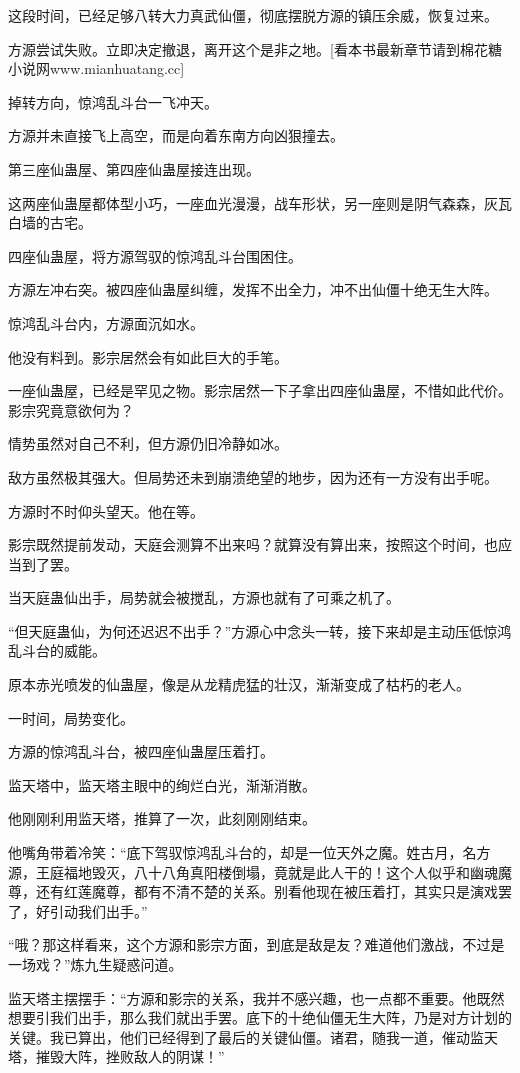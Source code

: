 \begin{this_body}
这段时间，已经足够八转大力真武仙僵，彻底摆脱方源的镇压余威，恢复过来。

方源尝试失败。立即决定撤退，离开这个是非之地。[看本书最新章节请到棉花糖小说网www.mianhuatang.cc]

掉转方向，惊鸿乱斗台一飞冲天。

方源并未直接飞上高空，而是向着东南方向凶狠撞去。

第三座仙蛊屋、第四座仙蛊屋接连出现。

这两座仙蛊屋都体型小巧，一座血光漫漫，战车形状，另一座则是阴气森森，灰瓦白墙的古宅。

四座仙蛊屋，将方源驾驭的惊鸿乱斗台围困住。

方源左冲右突。被四座仙蛊屋纠缠，发挥不出全力，冲不出仙僵十绝无生大阵。

惊鸿乱斗台内，方源面沉如水。

他没有料到。影宗居然会有如此巨大的手笔。

一座仙蛊屋，已经是罕见之物。影宗居然一下子拿出四座仙蛊屋，不惜如此代价。影宗究竟意欲何为？

情势虽然对自己不利，但方源仍旧冷静如冰。

敌方虽然极其强大。但局势还未到崩溃绝望的地步，因为还有一方没有出手呢。

方源时不时仰头望天。他在等。

影宗既然提前发动，天庭会测算不出来吗？就算没有算出来，按照这个时间，也应当到了罢。

当天庭蛊仙出手，局势就会被搅乱，方源也就有了可乘之机了。

“但天庭蛊仙，为何还迟迟不出手？”方源心中念头一转，接下来却是主动压低惊鸿乱斗台的威能。

原本赤光喷发的仙蛊屋，像是从龙精虎猛的壮汉，渐渐变成了枯朽的老人。

一时间，局势变化。

方源的惊鸿乱斗台，被四座仙蛊屋压着打。

监天塔中，监天塔主眼中的绚烂白光，渐渐消散。

他刚刚利用监天塔，推算了一次，此刻刚刚结束。

他嘴角带着冷笑：“底下驾驭惊鸿乱斗台的，却是一位天外之魔。姓古月，名方源，王庭福地毁灭，八十八角真阳楼倒塌，竟就是此人干的！这个人似乎和幽魂魔尊，还有红莲魔尊，都有不清不楚的关系。别看他现在被压着打，其实只是演戏罢了，好引动我们出手。”

“哦？那这样看来，这个方源和影宗方面，到底是敌是友？难道他们激战，不过是一场戏？”炼九生疑惑问道。

监天塔主摆摆手：“方源和影宗的关系，我并不感兴趣，也一点都不重要。他既然想要引我们出手，那么我们就出手罢。底下的十绝仙僵无生大阵，乃是对方计划的关键。我已算出，他们已经得到了最后的关键仙僵。诸君，随我一道，催动监天塔，摧毁大阵，挫败敌人的阴谋！”


\end{this_body}
